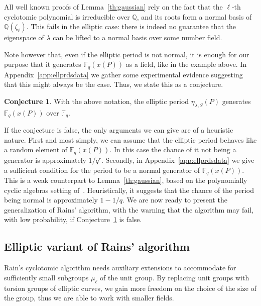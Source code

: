 \documentclass[12pt]{article}
\theoremstyle{plain}
\theoremstyle{definition}
\newtheorem{conjecture}[theorem]{Conjecture}
\def\Q{\ensuremath{\mathbb{Q}}}
\def\F{\ensuremath{\mathbb{F}}}
\newcounter{algorithm}
\begin{document}
All well known proofs of Lemma~\ref{th:gaussian} rely on the fact that
the $\ell$-th cyclotomic polynomial is irreducible over $\Q$, and its
roots form a normal basis of $\Q(\zeta_\ell)$. %
This fails in the elliptic case: there is indeed no guarantee that the
eigenspace of $\lambda$ can be lifted to a normal basis over some
number field.

Note however that, even if the elliptic period is not normal, it is
enough for our purpose that it generates $\F_q(x(P))$ as a field, like
in the example above.  In Appendix~\ref{app:ellprdsdata} we gather
some experimental evidence suggesting that this might always be the
case. Thus, we state this as a conjecture.

\begin{conjecture}
\label{conj:ellperiods}
With the above notation, the elliptic period $\eta_{\lambda,S}(P)$
generates $\F_q(x(P))$ over $\F_q$.
\end{conjecture}

If the conjecture is false, the only arguments we can give are of a
heuristic nature. First and most simply, we can assume that the
elliptic period behaves like a random element of $\F_q(x(P))$. In this
case the chance of it not being a generator is approximately
$1/q^r$. %
Secondly, in Appendix~\ref{app:ellprdsdata} we give a sufficient
condition for the period to be a normal generator of
$\F_q(x(P))$. This is a weak counterpart to Lemma~\ref{th:gaussian},
based on the polynomially cyclic algebras setting
of~\cite{Mihailescu2010825}. Heuristically, it suggests that the
chance of the period being normal is approximately $1-1/q$. %
We are now ready to present the generalization of Rains' algorithm,
with the warning that the algorithm may fail, with low probability, if
Conjecture~\ref{conj:ellperiods} is false.



\subsection{Elliptic variant of Rains' algorithm}

Rain's cyclotomic algorithm needs auxiliary extensions to accommodate
for sufficiently small subgroups $\mu_\ell$ of the unit group. By
replacing unit groups with torsion groups of elliptic curves, we gain
more freedom on the choice of the size of the group, thus we are able
to work with smaller fields.  
\end{document}
